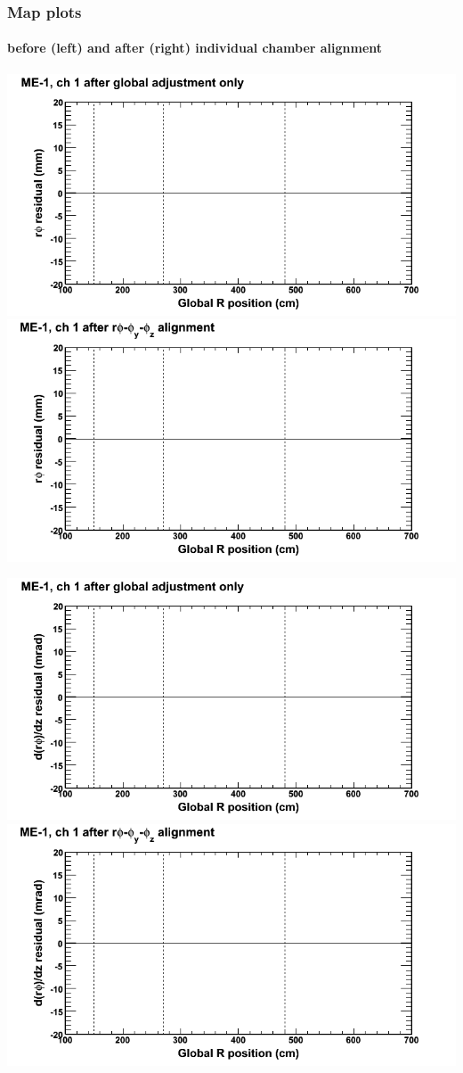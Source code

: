 \documentclass[compress]{beamer}
\begin{document}
\begin{frame}
\frametitle{Map plots}
\framesubtitle{before (left) and after (right) individual chamber alignment}
\includegraphics[width=0.5\linewidth]{ringmapplots_3dof/before_CSCvsr_mem1ch01_x.png} \includegraphics[width=0.5\linewidth]{ringmapplots_3dof/after_CSCvsr_mem1ch01_x.png}

\includegraphics[width=0.5\linewidth]{ringmapplots_3dof/before_CSCvsr_mem1ch01_dxdz.png} \includegraphics[width=0.5\linewidth]{ringmapplots_3dof/after_CSCvsr_mem1ch01_dxdz.png}
\end{frame}
\end{document}
